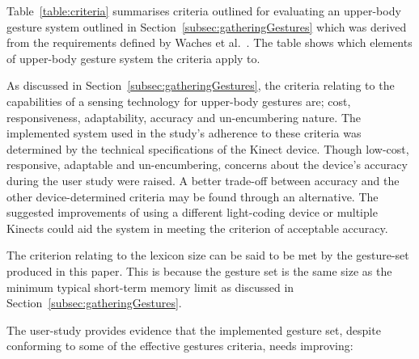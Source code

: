 \documentclass[link]{IWCOMP}
\begin{document}
   Table~\ref{table:criteria} summarises criteria outlined for evaluating an upper-body gesture system outlined in Section~\ref{subsec:gatheringGestures} which was derived from the requirements defined by Waches et al.~\citeyearpar{Wachs2011}.
   The table shows which elements of upper-body gesture system the criteria apply to.
   
   As discussed in Section~\ref{subsec:gatheringGestures}, the criteria relating to the capabilities of a sensing technology for upper-body gestures are; cost, responsiveness, adaptability, accuracy and un-encumbering nature.
   The implemented system used in the study's adherence to these criteria was determined by the technical specifications of the Kinect device.
   Though low-cost, responsive, adaptable and un-encumbering, concerns about the device's accuracy during the user study were raised.
   A better trade-off between accuracy and the other device-determined criteria may be found through an alternative.
   The suggested improvements of using a different light-coding device or multiple Kinects could aid the system in meeting the criterion of acceptable accuracy.
   
   The criterion relating to the lexicon size can be said to be met by the gesture-set produced in this paper.
   This is because the gesture set is the same size as the minimum typical short-term memory limit as discussed in Section~\ref{subsec:gatheringGestures}.
   
   The user-study provides evidence that the implemented gesture set, despite conforming to some of the effective gestures criteria, needs improving:
   
\end{document}
